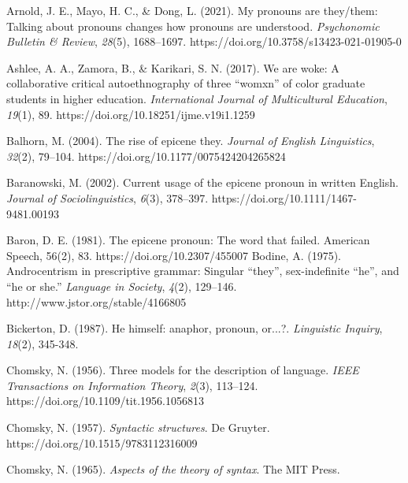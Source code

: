 \documentclass{article}
\begin{document}
\begin{thebibliography}{100}


    Arnold, J. E., Mayo, H. C., \& Dong, L. (2021). My pronouns are they/them: Talking about pronouns changes how pronouns are understood. \textit{Psychonomic Bulletin \& Review}, \textit{28}(5), 1688–1697. https://doi.org/10.3758/s13423-021-01905-0
    
     Ashlee, A. A., Zamora, B., \& Karikari, S. N. (2017). We are woke: A collaborative critical autoethnography of three “womxn” of color graduate students in higher education. \textit{International Journal of Multicultural Education}, \textit{19}(1), 89. https://doi.org/10.18251/ijme.v19i1.1259
    
     Balhorn, M. (2004). The rise of epicene they. \textit{Journal of English Linguistics}, \textit{32}(2), 79–104. https://doi.org/10.1177/0075424204265824
    
     Baranowski, M. (2002). Current usage of the epicene pronoun in written English. \textit{Journal of Sociolinguistics}, \textit{6}(3), 378–397. https://doi.org/10.1111/1467-9481.00193
    
    Baron, D. E. (1981). The epicene pronoun: The word that failed. American Speech, 56(2), 83. https://doi.org/10.2307/455007
     Bodine, A. (1975). Androcentrism in prescriptive grammar: Singular “they”, sex-indefinite “he”, and “he or she.” \textit{Language in Society}, \textit{4}(2), 129–146. http://www.jstor.org/stable/4166805
    
    Bickerton, D. (1987). He himself: anaphor, pronoun, or...?. \textit{Linguistic Inquiry}, \textit{18}(2), 345-348.
    
    Chomsky, N. (1956). Three models for the description of language. \textit{IEEE Transactions on Information Theory}, \textit{2}(3), 113–124. https://doi.org/10.1109/tit.1956.1056813
    
     Chomsky, N. (1957). \textit{Syntactic structures}. De Gruyter. https://doi.org/10.1515/9783112316009

     Chomsky, N. (1965). \textit{Aspects of the theory of syntax}. The MIT Press.
    

\end{thebibliography}
\end{document}

